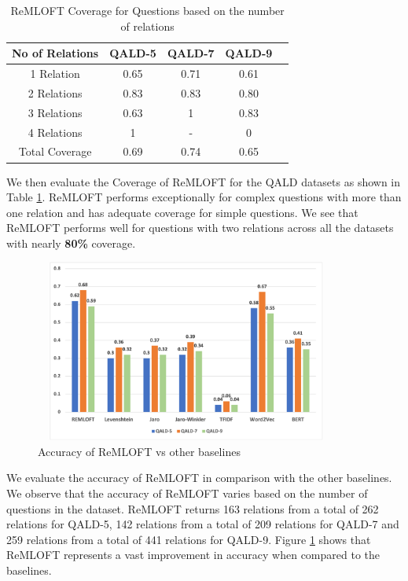 \begin{table}[H]
    \centering
    \begin{tabular}{|c|c|c|c|c|}
     \hline
     \textbf{No of Relations} & \textbf{QALD-5} & \textbf{QALD-7} & \textbf{QALD-9}  \\
    \hline
     1 Relation & 0.65 & 0.71	& 0.61 \\
    \hline
    2 Relations & 0.83 & 0.83 & 0.80 \\
    \hline
    3 Relations & 0.63 & 1	& 0.83 \\
    \hline
    4 Relations & 1 & - & 0 \\
    \hline
        Total Coverage & 0.69 & 0.74 & 0.65 \\
            \hline
    \end{tabular}
    \caption{ReMLOFT Coverage for Questions based on the number of relations}
    \label{tab:relationcoverage}
\end{table}

We then evaluate the Coverage of ReMLOFT for the QALD datasets as shown in Table \ref{tab:relationcoverage}. ReMLOFT performs exceptionally for complex questions with more than one relation and has adequate coverage for simple questions. We see that ReMLOFT performs well for questions with two relations across all the datasets with nearly \textbf{80\%} coverage. 
\begin{figure}[h]
    \centering
   \includegraphics[width=10cm, height=6cm]{chapters/figures/accuracyBert.png}
    \caption{Accuracy of ReMLOFT vs other baselines}
    \label{fig:graphacc}
\end{figure}

We evaluate the accuracy of ReMLOFT in comparison with the other baselines. We observe that the accuracy of ReMLOFT varies based on the number of questions in the dataset. ReMLOFT returns 163 relations from a total of 262 relations for QALD-5, 142 relations from a total of 209 relations for QALD-7 and 259 relations from a total of 441 relations for QALD-9. Figure \ref{fig:graphacc} shows that ReMLOFT represents a vast improvement in accuracy when compared to the baselines.

